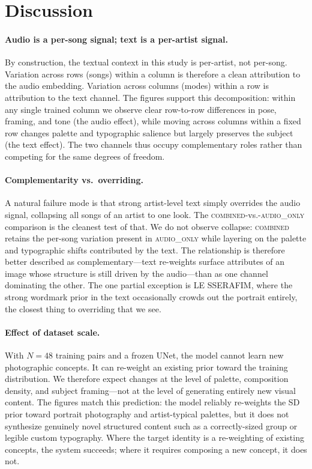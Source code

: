 \documentclass{article}
\begin{document}
\section{Discussion}
\label{sec:discussion}

\paragraph{Audio is a per-song signal; text is a per-artist signal.}
By construction, the textual context in this study is per-artist, not
per-song. Variation across rows (songs) within a column is therefore a
clean attribution to the audio embedding. Variation across columns
(modes) within a row is attribution to the text channel.
The figures support this decomposition: within any single trained column we
observe clear row-to-row differences in pose, framing, and tone (the audio
effect), while moving across columns within a fixed row changes palette and
typographic salience but largely preserves the subject (the text effect). The
two channels thus occupy complementary roles rather than competing for the same
degrees of freedom.

\paragraph{Complementarity vs.\ overriding.}
A natural failure mode is that strong artist-level text simply overrides
the audio signal, collapsing all songs of an artist to one look. The
\textsc{combined}-vs.-\textsc{audio\_only} comparison is the cleanest test
of that. We do not observe collapse: \textsc{combined} retains the per-song
variation present in \textsc{audio\_only} while layering on the palette and
typographic shifts contributed by the text. The relationship is therefore
better described as complementary---text re-weights surface attributes of an
image whose structure is still driven by the audio---than as one channel
dominating the other. The one partial exception is LE SSERAFIM, where the
strong wordmark prior in the text occasionally crowds out the portrait
entirely, the closest thing to overriding that we see.

\paragraph{Effect of dataset scale.}
With $N=48$ training pairs and a frozen UNet, the model cannot learn new
photographic concepts. It can re-weight an existing prior toward the
training distribution. We therefore expect changes at the level of
palette, composition density, and subject framing---not at the level of
generating entirely new visual content. The figures match this prediction:
the model reliably re-weights the SD prior toward portrait photography and
artist-typical palettes, but it does not synthesize genuinely novel structured
content such as a correctly-sized group or legible custom typography. Where the
target identity is a re-weighting of existing concepts, the system succeeds;
where it requires composing a new concept, it does not.
\end{document}
